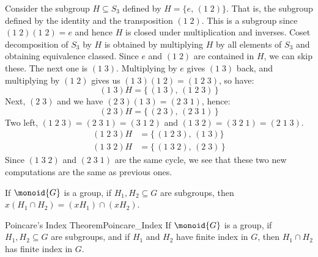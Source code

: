 \documentclass{article}                                                        %
\begin{document}
                \begin{example}
                    Consider the subgroup $H\subseteq{S}_{3}$ defined by
                    $H=\{e,\,(1\;2)\}$. That is, the subgroup defined by the
                    identity and the transposition $(1\;2)$. This is a subgroup
                    since $(1\;2)(1\;2)=e$ and hence $H$ is closed under
                    multiplication and inverses. Coset decomposition of $S_{3}$
                    by $H$ is obtained by multiplying $H$ by all elements of
                    $S_{3}$ and obtaining equivalence classed. Since
                    $e$ and $(1\;2)$ are contained in $H$, we can skip these.
                    The next one is $(1\;3)$. Multiplying by $e$ gives $(1\;3)$
                    back, and multiplying by $(1\;2)$ gives us
                    $(1\;3)(1\;2)=(1\;2\;3)$, so have:
                    \begin{equation}
                        (1\;3)H=\{\,(1\;3),\,(1\;2\;3)\,\}
                    \end{equation}
                    Next, $(2\;3)$ and we have $(2\;3)(1\;3)=(2\;3\;1)$, hence:
                    \begin{equation}
                        (2\;3)H=\{\,(2\;3),\,(2\;3\;1)\,\}
                    \end{equation}
                    Two left, $(1\;2\;3)=(2\;3\;1)=(3\;1\;2)$ and
                    $(1\;3\;2)=(3\;2\;1)=(2\;1\;3)$.
                    \begin{subequations}
                        \begin{align}
                            (1\;2\;3)H&=\{\,(1\;2\;3),\,(1\;3)\}\\
                            (1\;3\;2)H&=\{\,(1\;3\;2),\,(2\;3)\,\}
                        \end{align}
                    \end{subequations}
                    Since $(1\;3\;2)$ and $(2\;3\;1)$ are the same cycle, we see
                    that these two new computations are the same as previous
                    ones.
                \end{example}
                \begin{theorem}
                    If $\monoid{G}$ is a group, if $H_{1},H_{2}\subseteq{G}$ are
                    subgroups, then $x(H_{1}\cap{H}_{2})=(xH_{1})\cap(xH_{2})$.
                \end{theorem}
                \begin{ftheorem}{Poincare's Index Theorem}{Poincare_Index}
                    If $\monoid{G}$ is a group, if $H_{1},H_{2}\subseteq{G}$ are
                    subgroups, and if $H_{1}$ and $H_{2}$ have finite index
                    in $G$, then $H_{1}\cap{H}_{2}$ has finite index in $G$.
                \end{ftheorem}
\end{document}
